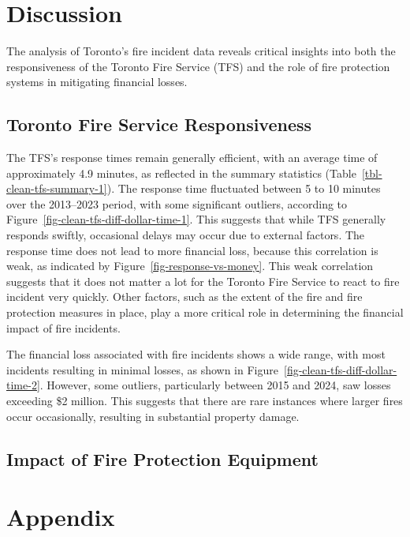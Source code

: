 \documentclass[
  letterpaper,
  DIV=11,
  numbers=noendperiod]{scrartcl}
\begin{document}
\section{Discussion}\label{discussion}

The analysis of Toronto's fire incident data reveals critical insights
into both the responsiveness of the Toronto Fire Service (TFS) and the
role of fire protection systems in mitigating financial losses.

\subsection{Toronto Fire Service
Responsiveness}\label{toronto-fire-service-responsiveness-1}

The TFS's response times remain generally efficient, with an average
time of approximately 4.9 minutes, as reflected in the summary
statistics (Table~\ref{tbl-clean-tfs-summary-1}). The response time
fluctuated between 5 to 10 minutes over the 2013--2023 period, with some
significant outliers, according to
Figure~\ref{fig-clean-tfs-diff-dollar-time-1}. This suggests that while
TFS generally responds swiftly, occasional delays may occur due to
external factors. The response time does not lead to more financial
loss, because this correlation is weak, as indicated by
Figure~\ref{fig-response-vs-money}. This weak correlation suggests that
it does not matter a lot for the Toronto Fire Service to react to fire
incident very quickly. Other factors, such as the extent of the fire and
fire protection measures in place, play a more critical role in
determining the financial impact of fire incidents.

The financial loss associated with fire incidents shows a wide range,
with most incidents resulting in minimal losses, as shown in
Figure~\ref{fig-clean-tfs-diff-dollar-time-2}. However, some outliers,
particularly between 2015 and 2024, saw losses exceeding \$2 million.
This suggests that there are rare instances where larger fires occur
occasionally, resulting in substantial property damage.

\subsection{Impact of Fire Protection
Equipment}\label{impact-of-fire-protection-equipment}

\newpage

\appendix

\section{Appendix}\label{sec-appendix}
\end{document}
